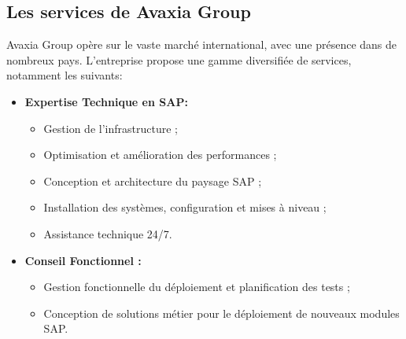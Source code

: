 \subsection{Les services de Avaxia Group}
\par Avaxia Group opère sur le vaste marché international, avec une présence dans de nombreux pays. 
L'entreprise propose une gamme diversifiée de services, notamment les suivants\cite{serAvaxia}:

\begin{itemize}

    \item \textbf{Expertise Technique en SAP: }
    \begin{itemize}
        \item  Gestion de l'infrastructure ;
        \item  Optimisation et amélioration des performances ;
        \item  Conception et architecture du paysage SAP ;
        \item  Installation des systèmes, configuration et mises à niveau ;
        \item  Assistance technique 24/7.
    \end{itemize}
    \item \textbf{Conseil Fonctionnel : }
            \begin{itemize}
                \item  Gestion fonctionnelle du déploiement et planification des tests ;
                \item  Conception de solutions métier pour le déploiement de nouveaux modules SAP.
        

\end{itemize}
\end{itemize}
